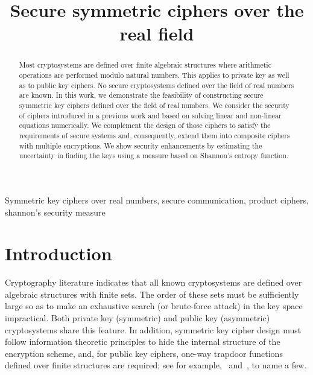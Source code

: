 \documentclass[10pt,journal]{IEEEtran}
\begin{document}
\title{Secure symmetric ciphers over the real field}


\author{ 

}

\maketitle
\begin{abstract}

Most cryptosystems are defined over finite algebraic structures where 
arithmetic operations are performed modulo natural numbers. 
This applies to private key as well as to public key ciphers.  
No secure cryptosystems defined over the field of real numbers 
are known. In this work, we demonstrate the feasibility of constructing 
secure symmetric key ciphers defined over the field of real numbers. 
We consider the security of ciphers introduced in a previous 
work and based on solving linear and non-linear equations numerically. 
We complement the design of those ciphers to satisfy the requirements 
of secure systems and, consequently, extend them into composite 
ciphers with multiple encryptions. We show security enhancements 
by estimating the uncertainty in finding the keys using a measure based 
on Shannon's entropy function.

\end{abstract}

\begin{IEEEkeywords}
Symmetric key ciphers over real numbers, secure communication, product ciphers, shannon's security measure
\end{IEEEkeywords}

\IEEEpeerreviewmaketitle

\section{Introduction}
\label{sec:intro}

Cryptography literature indicates that all known cryptosystems are 
defined over algebraic structures with finite sets. The order of these sets must 
be sufficiently large so as to make an exhaustive search (or brute-force attack) in 
the key space impractical. Both private key (symmetric) and public key (asymmetric) cryptosystems share this feature.  In addition, symmetric key cipher design must follow information theoretic principles to hide the internal structure of the encryption scheme, 
and, for public key ciphers, one-way trapdoor functions defined over finite structures 
are required; see for example,~\cite{menzes_1996, pieprzyk-2002, smart-2003} and~\cite{stinson-2005}, to name a few.
\newline
\end{document}
